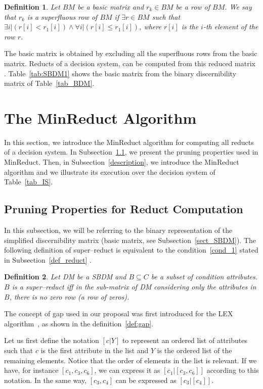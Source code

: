 \documentclass[authoryear,preprint,review,12pt]{elsarticle}
\newtheorem{definition}{Definition}
\begin{document}
  \begin{definition}\label{def:basic_row}
	Let $BM$ be a basic matrix and $r_k \in BM$ be a row of $BM$. We say that $r_k$ is a superfluous row of $BM$ if $\exists r \in BM$ such that $\exists i | (r[i] < r_1[i]) \wedge \forall i | (r[i] \leq r_1[i])$, where $r[i]$ is the $i$-th element of the row $r$.
  \end{definition}

  The basic matrix is obtained by excluding all the superfluous rows from the basic matrix. Reducts of a decision system, can be computed from this reduced matrix \citep{Yao09}. Table~\ref{tab:SBDM1} shows the basic matrix from the binary discernibility matrix of Table~\ref{tab_BDM}.

  
\section{The MinReduct Algorithm}\label{MinReduct}
  In this section, we introduce the MinReduct algorithm for computing all reducts of a decision system. In  Subsection~\ref{properties}, we present the pruning properties used in MinReduct. Then, in Subsection~\ref{description}, we introduce the MinReduct algorithm and we illustrate its execution over the decision system of Table~\ref{tab_IS}.
  
\subsection{Pruning Properties for Reduct Computation}\label{properties}
	In this subsection, we will be referring to the binary representation of the simplified discernibility matrix (basic matrix, see Subsection~\ref{sect_SBDM}). The following definition of super--reduct is equivalent to the condition~\ref{cond_1} stated in Subsection~\ref{def_reduct} \citep{Lazo15}.
	
	\begin{definition}\label{def:testor}
		Let DM be a SBDM and $B \subseteq C$ be a subset of condition attributes. $B$ is a super--reduct iff in the sub-matrix of DM considering only the attributes in $B$, there is no zero row (a row of zeros).
	\end{definition}
	
	The concept of gap used in our proposal was first introduced for the LEX algorithm~\cite{Santiesteban03}, as shown in the definition~\ref{def:gap}.
	
	Let us first define the notation $[c|Y]$ to represent an ordered list of attributes such that $c$ is the first attribute in the list and $Y$ is the ordered list of the remaining elements. Notice that the order of elements in the list is relevant. If we have, for instance $[c_1,c_3,c_6]$, we can express it as $[c_1|[c_3,c_6]]$ according to this notation. In the same way, $[c_3,c_4]$ can be expressed as $[c_3|[c_4]]$.
	
\end{document}
